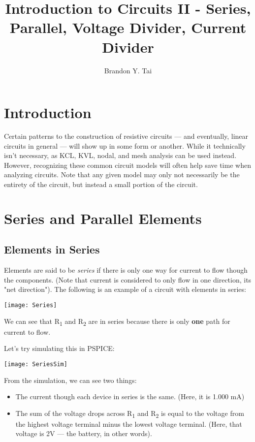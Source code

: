 \documentclass[12pt,letterpaper]{article}
\begin{document}
\title{Introduction to Circuits II - Series, Parallel, Voltage Divider, Current Divider}
\author{Brandon Y. Tai}
\maketitle

\setcounter{section}{-1}

\section{Introduction}
	Certain patterns to the construction of resistive circuits --- and eventually, linear circuits in general --- will show up in some form or another. While it technically isn't necessary, as KCL, KVL, nodal, and mesh analysis can be used instead. However, recognizing these common circuit models will often help save time when analyzing circuits. Note that any given model may only not necessarily be the entirety of the circuit, but instead a small portion of the circuit.

\section{Series and Parallel Elements}

\subsection{Elements in Series}
Elements are said to be \textit{series} if there is only one way for current to flow though the components. (Note that current is considered to only flow in one direction, its "net direction"). The following is an example of a circuit with elements in series:

\begin{center}
\texttt{[image: Series]}
\end{center}

We can see that R\textsubscript{1} and R\textsubscript{2} are in series because there is only \textbf{one} path for current to flow. \par

Let's try simulating this in PSPICE:

\begin{center}
\texttt{[image: SeriesSim]}
\end{center}

From the simulation, we can see two things: 
\begin{itemize}
\item The current though each device in series is the same. (Here, it is 1.000 mA)
\item The sum of the voltage drops across R\textsubscript{1} and R\textsubscript{2} is equal to the voltage from the highest voltage terminal minus the lowest voltage terminal. (Here, that voltage is 2V --- the battery, in other words).
\end{itemize}
\end{document}
